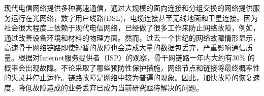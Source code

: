 %
%

现代电信网络提供多种高速通信，通过大规模的面向连接和分组交换的网络提供服务运行在光网络，数字用户线路(DSL)，电缆连接甚至无线地面和卫星连接。因为社会很大程度上依赖于现代电信网络，已经做了很多工作来防止网络故障，例如，通过改善设备环境和材料的物理方面。然而，过去一个世纪的网络故障情形显示，高速骨干网络链路即使短暂的故障也会造成大量的数据包丢弃，严重影响通信质量。根据对Internet服务提供者（ISP）的观察，骨干网链路一年内大约有30\% 的概率会出现故障\cite{doerr2014all}。不论采取了哪些预防性保护措施，网络节点和链接将最终概率性的失灵并停止运作。链路故障是网络中较为普遍的现象。因此，加快故障的恢复速度，降低故障造成的业务丢弃已成为当前研究亟待解决的问题。

